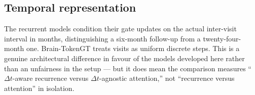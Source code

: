 
\subsection{Temporal representation}

The recurrent models condition their gate updates on the actual inter-visit interval in
months, distinguishing a six-month follow-up from a twenty-four-month one. Brain-TokenGT
treats visits as uniform discrete steps. This is a genuine architectural difference in
favour of the models developed here rather than an unfairness in the setup --- but it does
mean the comparison measures ``$\Delta t$-aware recurrence versus $\Delta t$-agnostic
attention,'' not ``recurrence versus attention'' in isolation.
